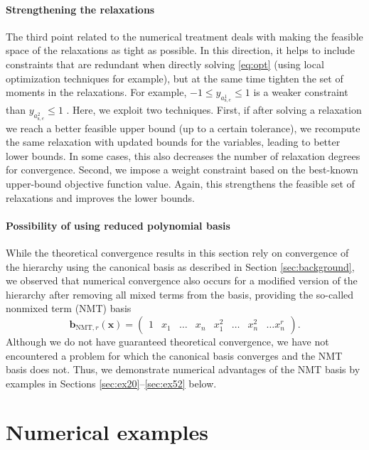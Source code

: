 \documentclass[final,onefignum,onetabnum]{siamart220329}
\begin{document}
\paragraph{Strengthening the relaxations} The third point related to the numerical treatment deals with making the feasible space of the relaxations as tight as possible. In this direction, it helps to include constraints that are redundant {when directly solving} \eqref{eq:opt} {(using local optimization techniques for example)}, but at the same time tighten the set of moments in the relaxations. For example, $-1\le y_{a_{\mathrm{s},e}^1} \le 1$ is a weaker constraint than $y_{a_{\mathrm{s},e}^2} \le 1$ \cite[Appendix 2]{Tyburec2021}. Here, we exploit two techniques. First, if after solving a relaxation we reach a better feasible upper bound (up to a certain tolerance), we recompute the same relaxation with updated bounds for the variables, leading to better lower bounds. In some cases, this also decreases the number of relaxation degrees for convergence. Second, we impose a weight constraint based on the best-known upper-bound objective function value. Again, this strengthens the feasible set of relaxations and improves the lower bounds.

\paragraph{Possibility of using reduced polynomial basis} While the theoretical convergence results in this section rely on convergence of the hierarchy {using the canonical basis} as described in Section \ref{sec:background}, we observed that numerical convergence also occurs for a modified version of the hierarchy {after} removing all mixed terms from the basis, providing the so-called nonmixed term (NMT) basis \cite{handa2024tssos}
%
\begin{equation}
    \mathbf{b}_{\mathrm{NMT},r}(\mathbf{x}) = \begin{pmatrix}
        1 & x_1 & \dots & x_n & x_1^2 & \dots & x_n^2 & \dots x_n^r
    \end{pmatrix}.
\end{equation}
%
{Although we do not have guaranteed theoretical convergence, we have not encountered a problem for which the canonical basis converges and the NMT basis does not. Thus, we demonstrate numerical} advantages of the NMT basis {by} examples in Sections \ref{sec:ex20}--\ref{sec:ex52} below.

\section{Numerical examples}
\end{document}
